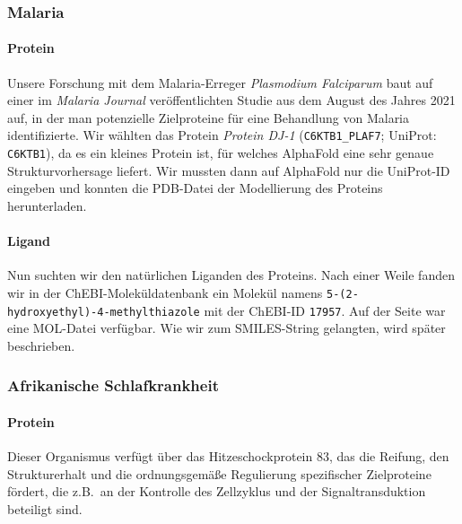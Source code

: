 \documentclass[10pt]{article}
\begin{document}

    \subsubsection{Malaria}\label{subsubsec:malaria}

    \paragraph{Protein}

    Unsere Forschung mit dem Malaria-Erreger \emph{Plasmodium Falciparum} baut auf einer im \emph{Malaria Journal}
    veröffentlichten Studie aus dem August des Jahres 2021 auf, in der man potenzielle Zielproteine für eine
    Behandlung von Malaria identifizierte.
    Wir wählten das Protein \emph{Protein DJ-1}
    (\texttt{C6KTB1\_PLAF7};
    UniProt: \texttt{C6KTB1}), da es ein kleines Protein ist, für welches
    AlphaFold eine sehr genaue Strukturvorhersage liefert.\cite{1}
    Wir mussten dann auf AlphaFold nur die UniProt-ID eingeben und konnten die PDB-Datei der Modellierung des
    Proteins herunterladen.

    \paragraph{Ligand}
    Nun suchten wir den natürlichen Liganden des Proteins.
    Nach einer Weile fanden wir in der ChEBI-Moleküldatenbank
    ein Molekül namens \texttt{5-(2-hydroxyethyl)-4-methylthiazole} mit der ChEBI-ID \texttt{17957}.\cite{11}
    Auf der Seite war eine MOL-Datei verfügbar.
    Wie wir zum SMILES-String gelangten, wird später beschrieben.

    \subsubsection{Afrikanische Schlafkrankheit}\label{subsubsec:afrikanische-schlafkrankheit}

    \paragraph{Protein}
    Dieser Organismus verfügt über das Hitzeschockprotein 83, das die Reifung, den Strukturerhalt und die
    ordnungsgemäße Regulierung spezifischer Zielproteine fördert, die z.B.\ an der Kontrolle des Zellzyklus und der
    Signaltransduktion beteiligt sind.
\end{document}
